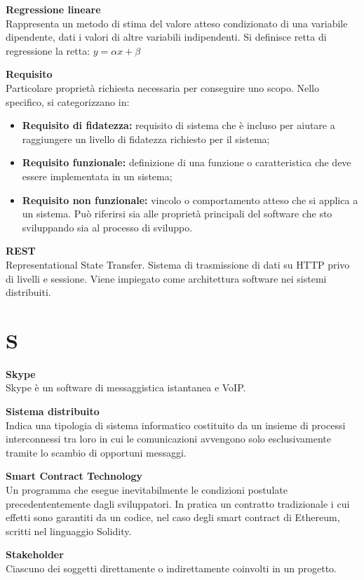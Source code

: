 \documentclass[a4paper, oneside, openany, dvipsnames, table, 12pt]{article}
\begin{document}
\textbf{Regressione lineare} \\
Rappresenta un metodo di stima del valore atteso condizionato di una variabile dipendente, dati i valori di altre variabili indipendenti. Si definisce retta di regressione la retta: $y = \alpha x + \beta $

\textbf{Requisito}\\	Particolare proprietà richiesta necessaria per conseguire uno scopo. Nello specifico, si categorizzano in:
\begin{itemize}
	\item \textbf{Requisito di fidatezza:} requisito di sistema che è incluso per aiutare a raggiungere un livello di fidatezza richiesto per il sistema;
	\item \textbf{Requisito funzionale:} definizione di una funzione o caratteristica che deve essere implementata in un sistema;
	\item \textbf{Requisito non funzionale:} vincolo o comportamento atteso che si applica a un sistema. Può riferirsi sia alle proprietà principali del software che sto sviluppando sia al processo di sviluppo.
\end{itemize}

\textbf{REST} \\
Representational State Transfer. Sistema di trasmissione di dati su HTTP privo di livelli e sessione. Viene impiegato come architettura software nei sistemi distribuiti.

\newpage
\section{S}
\textbf{Skype} \\
Skype è un software di messaggistica istantanea e VoIP\glo.

\textbf{Sistema distribuito} \\
Indica una tipologia di sistema informatico costituito da un insieme di processi interconnessi tra loro in cui le comunicazioni avvengono solo esclusivamente tramite lo scambio di opportuni messaggi.

\textbf{Smart Contract Technology} \\
Un programma che esegue inevitabilmente le condizioni postulate precedententemente
dagli sviluppatori. In pratica un contratto tradizionale i cui effetti sono
garantiti da un codice, nel caso degli smart contract di Ethereum, scritti nel
linguaggio Solidity.

\textbf{Stakeholder} \\
Ciascuno dei soggetti direttamente o indirettamente coinvolti in un progetto.
\end{document}
